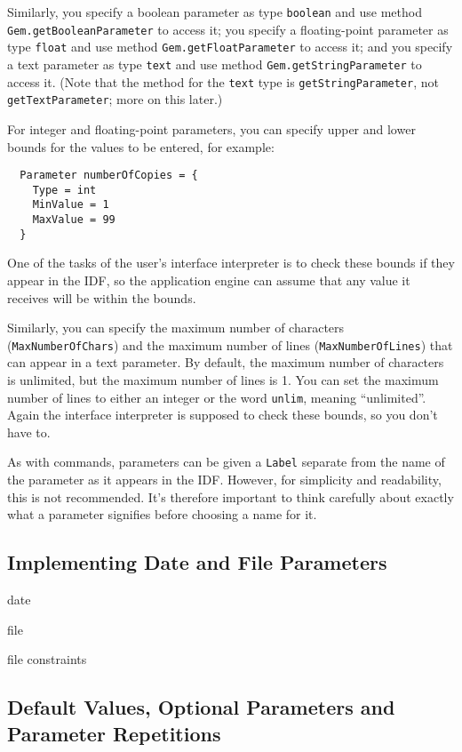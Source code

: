 \documentclass[11pt]{report}
\begin{document}
Similarly, you specify a boolean parameter as type {\tt boolean}
and use method {\tt Gem.getBooleanParameter} to access it;
you specify a floating-point parameter as type {\tt float}
and use method {\tt Gem.getFloatParameter} to access it; and
you specify a text parameter as type {\tt text}
and use method {\tt Gem.getStringParameter}
to access it.  (Note that the method for the {\tt text} type is
{\tt getStringParameter}, not {\tt getTextParameter}; more on
this later.)

For integer and floating-point parameters, you can specify upper
and lower bounds for the values to be entered, for example:
\begin{verbatim}
  Parameter numberOfCopies = {
    Type = int
    MinValue = 1
    MaxValue = 99
  }
\end{verbatim}
One of the tasks of the user's interface interpreter is to
check these bounds if they appear in the IDF, so the application
engine can assume that any value it receives will be within the
bounds.

Similarly, you can specify the maximum number of characters
({\tt MaxNumberOfChars}) and the maximum number of lines
({\tt MaxNumberOfLines}) that can appear in a text parameter.
By default, the maximum number of characters is unlimited, but
the maximum number of lines is 1.  You can set the maximum
number of lines to either an integer or the word {\tt unlim},
meaning ``unlimited''.  Again the interface interpreter is
supposed to check these bounds, so you don't have to.

As with commands, parameters can be given a {\tt Label}
separate from the name of the parameter as it appears in the
IDF.  However, for simplicity and readability, this is not
recommended.  It's therefore important to think carefully about
exactly what a parameter signifies before choosing a name for it.

\subsection{Implementing Date and File Parameters}

date

file

file constraints

\subsection{Default Values, Optional Parameters and Parameter Repetitions}
\end{document}
